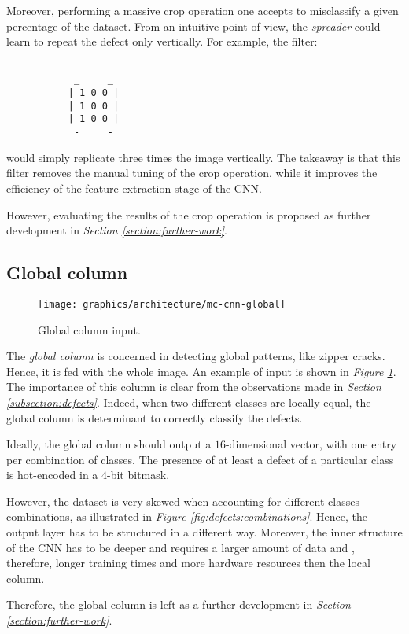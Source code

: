         \par{
            Moreover, performing a massive crop operation one accepts to misclassify a given percentage of the dataset. From an intuitive point of view, the \emph{spreader} could learn to repeat the defect only vertically.
            For example, the filter:
        }
        \par{
        \begin{BVerbatim}

            _     _
           | 1 0 0 |
           | 1 0 0 |
           | 1 0 0 |
            -     -
       \end{BVerbatim}
        }
        \par{
            would simply replicate three times the image vertically. The takeaway is that this filter removes the manual tuning of the crop operation, while it improves the efficiency of the feature extraction stage of the CNN.
        }
        \par{
            However, evaluating the results of the crop operation is proposed as further development in \emph{Section \ref{section:further-work}}.
        }
    \subsection{Global column}\label{section:global-column}
        \begin{figure}
            \centering
            \texttt{[image: graphics/architecture/mc-cnn-global]}
            \caption{Global column input.}\label{fig:mc-cnn:global-input}
        \end{figure}
        \par{
            The \emph{global column} is concerned in detecting global patterns, like zipper cracks. Hence, it is fed with the whole image. An example of input is shown in \emph{Figure \ref{fig:mc-cnn:global-input}}. The importance of this column is clear from the observations made in \emph{Section \ref{subsection:defects}}. Indeed, when two different classes are locally equal, the global column is determinant to correctly classify the defects.
        }
        \par{
            Ideally, the global column should output a $16$-dimensional vector, with one entry per combination of classes. The presence of at least a defect of a particular class is hot-encoded in a $4$-bit bitmask.
        }
        \par{
            However, the dataset is very skewed when accounting for different classes combinations, as illustrated in \emph{Figure \ref{fig:defects:combinations}}. Hence, the output layer has to be structured in a different way. Moreover, the inner structure of the CNN has to be deeper and requires a larger amount of data and 
            , therefore, longer training times and more hardware resources then the local column.
        }
        \par{
            Therefore, the global column is left as a further development in \emph{Section \ref{section:further-work}}.
        }
